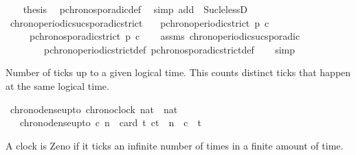 \begin{isabellebody}
\ \ \isamarkupfalse%
\ {\isacharquery}thesis\ \isamarkupfalse%
\ p{\isacharunderscore}chronosporadic{\isacharunderscore}def\ \isamarkupfalse%
\ {\isacharparenleft}simp\ add{\isacharcolon}\ {\isachardoublequoteopen}{\isacharasterisk}{\isachardoublequoteclose}\ Suc{\isacharunderscore}le{\isacharunderscore}lessD{\isacharparenright}\isanewline
{}\isamarkupfalse%
%
\endisatagproof
{\isafoldproof}%
%
\isadelimproof
\isanewline
%
\endisadelimproof
\isanewline
{}\isamarkupfalse%
\ chrono{\isacharunderscore}periodic{\isacharunderscore}suc{\isacharunderscore}sporadic{\isacharunderscore}strict{\isacharcolon}\isanewline
\ \ \ {\isacartoucheopen}p{\isacharunderscore}chronoperiodic{\isacharunderscore}strict\ {\isacharparenleft}p{\isacharplus}{}{\isacharparenright}\ c{\isacartoucheclose}\isanewline
\ \ \ \ \ {\isacartoucheopen}p{\isacharunderscore}chronosporadic{\isacharunderscore}strict\ p\ c{\isacartoucheclose}\isanewline
%
\isadelimproof
\ \ %
\endisadelimproof
%
\isatagproof
{}\isamarkupfalse%
\ assms\ chrono{\isacharunderscore}periodic{\isacharunderscore}suc{\isacharunderscore}sporadic\isanewline
\ \ \ \ \ \ \ \ p{\isacharunderscore}chronoperiodic{\isacharunderscore}strict{\isacharunderscore}def\ p{\isacharunderscore}chronosporadic{\isacharunderscore}strict{\isacharunderscore}def\isanewline
\ \ \isamarkupfalse%
\ simp%
\endisatagproof
{\isafoldproof}%
%
\isadelimproof
%
\endisadelimproof
%
\begin{isamarkuptext}%
Number of ticks up to a given logical time.
This counts distinct ticks that happen at the same logical time.%
\end{isamarkuptext}\isamarkuptrue%
\isamarkupfalse%
\ chrono{\isacharunderscore}dense{\isacharunderscore}up{\isacharunderscore}to\ {\isacharcolon}{\isacharcolon}{\isacartoucheopen}{\isacharbrackleft}chronoclock{\isacharcomma}\ nat{\isacharbrackright}\ {\isasymRightarrow}\ nat{\isacartoucheclose}\isanewline
\ \ \ {\isacartoucheopen}chrono{\isacharunderscore}dense{\isacharunderscore}up{\isacharunderscore}to\ c\ n\ {\isacharequal}\ card\ {\isacharbraceleft}t{\isachardot}\ c\isactrlbsub t\isactrlesub \ {\isasymle}\ n\ {\isasymand}\ c\ {\isasymnabla}\ t{\isacharbraceright}{\isacartoucheclose}%
\begin{isamarkuptext}%
A clock is Zeno if it ticks an infinite number of times in a finite amount of time.%
\end{isamarkuptext}\isamarkuptrue%

\end{isabellebody}
